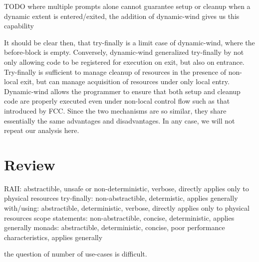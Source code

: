 \documentclass[11pt]{article}
\newcommand{\maybePage}{\newpage}
\begin{document}
TODO where multiple prompts alone cannot guarantee setup or cleanup when a dynamic extent is entered/exited, the addition of dynamic-wind gives us this capability

It should be clear then, that try-finally is a limit case of dynamic-wind, where the before-block is empty.
Conversely, dynamic-wind generalized try-finally by not only allowing code to be registered for execution on exit, but also on entrance.
Try-finally is sufficient to manage cleanup of resources in the presence of non-local exit, but can manage acquisition of resources under only local entry.
Dynamic-wind allows the programmer to ensure that both setup and cleanup code are properly executed even under non-local control flow such as that introduced by FCC.
Since the two mechanisms are so similar, they share essentially the same advantages and disadvantages.
In any case, we will not repeat our analysis here.




\maybePage
\section{Review}
\label{sec:review}





RAII: abstractible, unsafe or non-deterministic, verbose, directly applies only to physical resources
try-finally: non-abstractible, determistic, applies generally
with/using: abstractible, deterministic, verbose, directly applies only to physical resources
scope statements: non-abstractible, concise, deterministic, applies generally
monads: abstractible, deterministic, concise, poor performance characteristics, applies generally

the question of number of use-cases is difficult.
\end{document}
